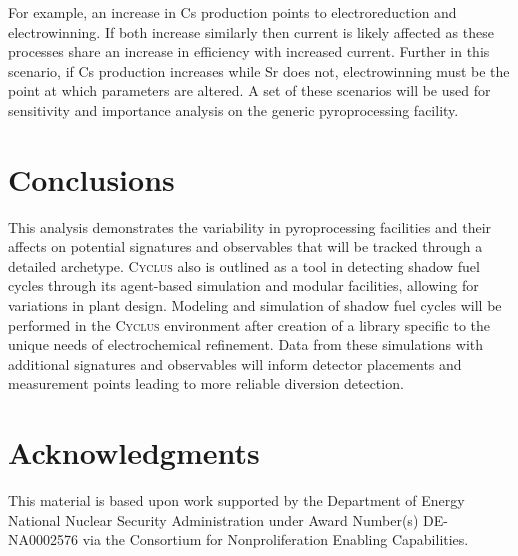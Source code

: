\documentclass{anstrans}
\newcommand{\Cyclus}{\textsc{Cyclus}\xspace}%
\begin{document}
For example, an increase in Cs production points to electroreduction and electrowinning. 
If both increase similarly then current is likely affected as these processes share an increase in efficiency with increased 
current. Further in this scenario, if Cs production increases while Sr does not, electrowinning must be the point at which 
parameters are altered. A set of these scenarios will be used for sensitivity and importance analysis on the generic 
pyroprocessing facility.

\section{Conclusions}
This analysis demonstrates the variability in pyroprocessing facilities and their affects on potential 
signatures and observables that will be tracked through a detailed archetype. \Cyclus also is outlined as a tool in 
detecting shadow fuel cycles through its agent-based simulation and modular facilities, allowing for variations in 
plant design. Modeling and simulation of shadow fuel cycles will be performed in the \Cyclus environment after 
creation of a library specific to the unique needs of electrochemical refinement. Data from these simulations with 
additional signatures and observables will inform detector placements and measurement points leading to more 
reliable diversion detection.

\section{Acknowledgments}
This material is based upon work supported by the Department of Energy
National Nuclear Security Administration under Award Number(s) DE-NA0002576 via
the Consortium for Nonproliferation Enabling Capabilities.



\end{document}
